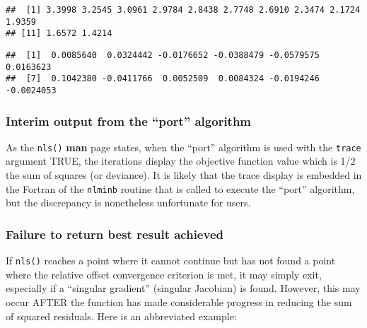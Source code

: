 \documentclass[
]{article}
\newenvironment{Shaded}{\begin{snugshade}}{\end{snugshade}}
\newcommand{\AttributeTok}[1]{\textcolor[rgb]{0.77,0.63,0.00}{#1}}
\newcommand{\FunctionTok}[1]{\textcolor[rgb]{0.00,0.00,0.00}{#1}}
\newcommand{\NormalTok}[1]{#1}
\newcommand{\OtherTok}[1]{\textcolor[rgb]{0.56,0.35,0.01}{#1}}
\newcommand{\SpecialCharTok}[1]{\textcolor[rgb]{0.00,0.00,0.00}{#1}}
\begin{document}
\begin{verbatim}
##  [1] 3.3998 3.2545 3.0961 2.9784 2.8438 2.7748 2.6910 2.3474 2.1724 1.9359
## [11] 1.6572 1.4214
\end{verbatim}

\begin{Shaded}
\end{Shaded}

\begin{verbatim}
##  [1]  0.0085640  0.0324442 -0.0176652 -0.0388479 -0.0579575  0.0163623
##  [7]  0.1042380 -0.0411766  0.0052509  0.0084324 -0.0194246 -0.0024053
\end{verbatim}

\hypertarget{interim-output-from-the-port-algorithm}{%
\subsubsection{Interim output from the ``port''
algorithm}\label{interim-output-from-the-port-algorithm}}

As the \texttt{nls()} \textbf{man} page states, when the ``port''
algorithm is used with the \texttt{trace} argument TRUE, the iterations
display the objective function value which is 1/2 the sum of squares (or
deviance). It is likely that the trace display is embedded in the
Fortran of the \texttt{nlminb} routine that is called to execute the
``port'' algorithm, but the discrepancy is nonetheless unfortunate for
users.

\hypertarget{failure-to-return-best-result-achieved}{%
\subsubsection{Failure to return best result
achieved}\label{failure-to-return-best-result-achieved}}

If \texttt{nls()} reaches a point where it cannot continue but has not
found a point where the relative offset convergence criterion is met, it
may simply exit, especially if a ``singular gradient'' (singular
Jacobian) is found. However, this may occur AFTER the function has made
considerable progress in reducing the sum of squared residuals. Here is
an abbreviated example:
\end{document}
